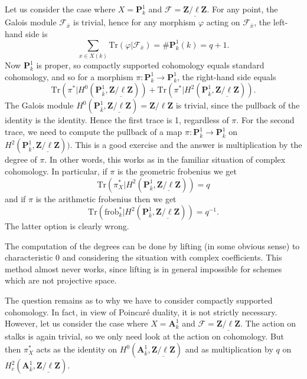Let us consider the case where $X = \mathbf{P}^1_k$ and $\mathcal{F} = \underline{\mathbf{Z}/\ell\mathbf{Z}}$. For any point, the Galois module $\mathcal{F}_{\bar x}$ is trivial, hence for any morphism $\varphi$ acting on $\mathcal{F}_{\bar x}$, the left-hand side is
$$
\sum_{x \in X(k)} \text{Tr}(\varphi | \mathcal{F}_{\bar x}) = \#\mathbf{P}^1_k(k) = q+1.
$$
Now $\mathbf{P}^1_k$ is proper, so compactly supported cohomology equals standard cohomology, and so for a morphism $\pi : \mathbf{P}^1_k \to \mathbf{P}^1_k$, the right-hand side equals
$$
\text{Tr}(\pi^* | H^0 (\mathbf{P}^1_{\bar k}, \underline{\mathbf{Z}/\ell\mathbf{Z}})) + \text{Tr}(\pi^* | H^2 (\mathbf{P}^1_{\bar k}, \underline{\mathbf{Z}/\ell\mathbf{Z}})).
$$
The Galois module $H^0 (\mathbf{P}^1_{\bar k}, \underline{\mathbf{Z}/\ell\mathbf{Z}}) = \mathbf{Z}/\ell\mathbf{Z}$ is trivial, since the pullback of the identity is the identity. Hence the first trace is 1, regardless of $\pi$. For the second trace, we need to compute the pullback of a map $\pi: \mathbf{P}^1_{\bar k} \to \mathbf{P}^1_{\bar k}$ on $H^2 (\mathbf{P}^1_{\bar k}, \underline{\mathbf{Z}/\ell\mathbf{Z}}))$. This is a good exercise and the answer is multiplication by the degree of $\pi$. In other words, this works as in the familiar situation of complex cohomology. In particular, if $\pi$ is the geometric frobenius we get 
$$
\text{Tr}(\pi_X^* | H^2 (\mathbf{P}^1_{\bar k}, \underline{\mathbf{Z}/\ell\mathbf{Z}})) = q
$$ 
and if $\pi$ is the arithmetic frobenius then we get 
$$
\text{Tr}(\text{frob}_k^* | H^2 (\mathbf{P}^1_{\bar k}, \underline{\mathbf{Z}/\ell\mathbf{Z}})) = q^{-1}.
$$
The latter option is clearly wrong. 

\begin{remark}
The computation of the degrees can be done by lifting (in some obvious sense) to characteristic 0 and considering the situation with complex coefficients. This method almost never works, since lifting is in general impossible for schemes which are not projective space.
\end{remark}

The question remains as to why we have to consider compactly supported cohomology. In fact, in view of Poincar\'e duality, it is not strictly necessary. However, let us consider the case where $X = \mathbf{A}^1_k$ and $\mathcal{F} = \underline{\mathbf{Z}/\ell\mathbf{Z}}$. The action on stalks is again trivial, so we only need look at the action on cohomology. But then $\pi_X^*$ acts as the identity on $H^0(\mathbf{A}^1_{\bar k}, \underline{\mathbf{Z}/\ell\mathbf{Z}})$ and as multiplication by $q$ on $H^2_c(\mathbf{A}^1_{\bar k}, \underline{\mathbf{Z}/\ell\mathbf{Z}})$. 

